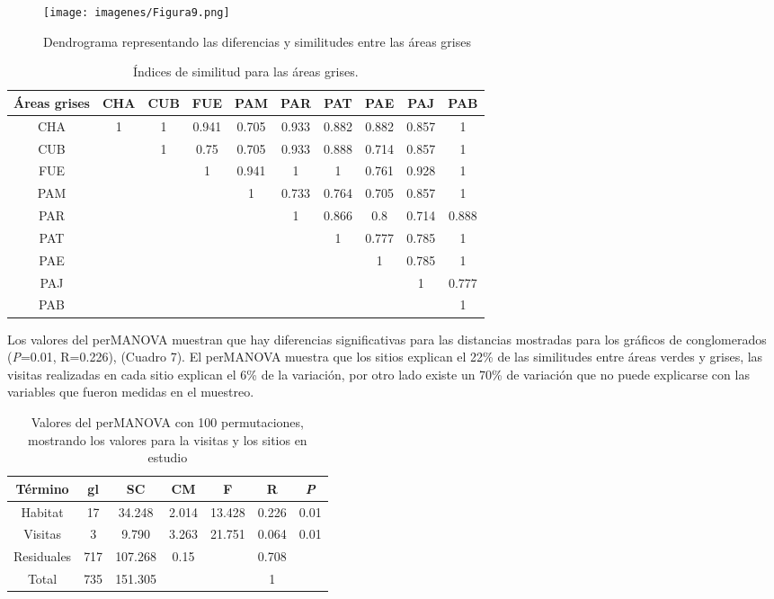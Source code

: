 \documentclass[letterpaper,12pt]{article}
\begin{document}
\begin{center}
\begin{figure}[H]
\texttt{[image: imagenes/Figura9.png]}\\
\caption[Dendrograma para las áreas grises]{Dendrograma representando las diferencias y similitudes entre las áreas grises}
\end{figure}
\end{center}
\newpage
{\footnotesize
\begin{longtable}[c] {cccccccccc} 
\caption[Índices de similitud para las áreas grises]{Índices de similitud para las áreas grises. } \\
Áreas grises & CHA & CUB & FUE  & PAM & PAR & PAT & PAE & PAJ & PAB  \\ \midrule
CHA & 1 & 1 & 0.941 & 0.705 & 0.933 & 0.882 & 0.882 & 0.857 & 1 \\
CUB &  & 1 & 0.75 & 0.705 & 0.933 & 0.888 & 0.714 & 0.857 & 1 \\
FUE &  &  & 1 & 0.941 & 1 & 1 & 0.761 & 0.928 & 1 \\ 
PAM &  &  &  & 1 & 0.733 & 0.764 & 0.705 & 0.857 & 1 \\
PAR &  & & & & 1 & 0.866 & 0.8 & 0.714 & 0.888 \\ 
PAT & & & & & & 1 & 0.777 & 0.785 & 1 \\
PAE & & & & & & & 1 & 0.785 & 1 \\
PAJ & & & & & & & & 1 & 0.777\\
PAB & & & & & & & & & 1 \\ \bottomrule
\end{longtable}
}

Los valores del perMANOVA  muestran que hay diferencias significativas para las distancias mostradas para los gráficos de conglomerados (\textit{P}=0.01, R=0.226), (Cuadro 7). El perMANOVA muestra que los sitios explican el 22\% de las similitudes entre áreas verdes y grises, las visitas realizadas en cada sitio explican el 6\% de la variación, por otro lado existe un 70\% de variación que no puede explicarse con las variables que fueron medidas en el muestreo.
{\footnotesize
\begin{longtable}[c] {ccccccc} 
\caption[Cuadro de perMANOVA]{Valores del perMANOVA con 100 permutaciones, mostrando los valores para la visitas y los sitios en estudio} \\
Término & gl & SC & CM & F & R & \textit{P}   \\ \midrule
Habitat & 17 & 34.248 & 2.014 & 13.428 & 0.226 & 0.01 \\
Visitas & 3 & 9.790 & 3.263 & 21.751 & 0.064 & 0.01 \\
Residuales & 717 & 107.268 & 0.15 &  & 0.708 &  \\ 
Total & 735 & 151.305 & & & 1 & \\ \bottomrule

\end{longtable}
}
\end{document}
